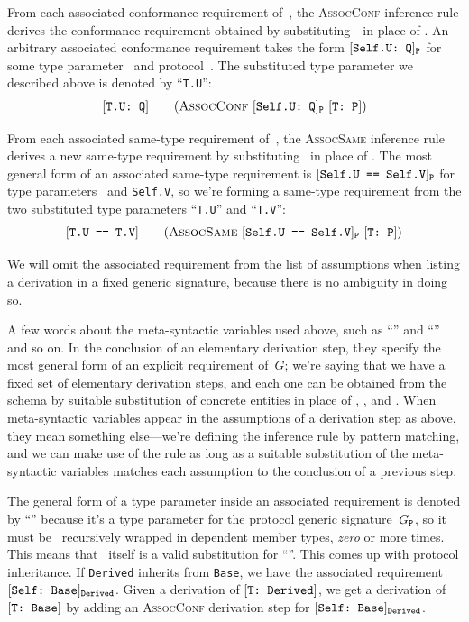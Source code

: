 \documentclass[../generics]{subfiles}
\begin{document}
From each associated conformance requirement of~\tP, the \textsc{AssocConf} inference rule derives the conformance requirement obtained by substituting~\tT\ in place of \IndexSelf \tSelf. An arbitrary associated conformance requirement takes the form $[\texttt{Self.U:~Q}]_{\texttt{P}}$ for some type parameter \SelfU\ and protocol~\tQ. The substituted type parameter we described above is denoted by ``\texttt{T.U}'':
\begin{gather*}
\AssocConfStepDef
\end{gather*}

From each associated same-type requirement of~\tP, the \textsc{AssocSame} inference rule derives a new same-type requirement by substituting \tT\ in place of \tSelf. The most general form of an associated same-type requirement is $[\texttt{Self.U == Self.V}]_{\texttt{P}}$ for type parameters \SelfU\ and \texttt{Self.V}, so we're forming a same-type requirement from the two substituted type parameters ``\texttt{T.U}'' and ``\texttt{T.V}'':
\begin{gather*}
\AssocSameStepDef
\end{gather*}

We will omit the associated requirement from the list of assumptions when listing a derivation in a fixed generic signature, because there is no ambiguity in doing so.

A few words about the meta-syntactic variables used above, such as ``\tT'' and ``\tU'' and so on. In the conclusion of an elementary derivation step, they specify the most general form of an explicit requirement of~$G$; we're saying that we have a fixed set of elementary derivation steps, and each one can be obtained from the schema by suitable substitution of concrete entities in place of \tT, \tU, and \tP. When meta-syntactic variables appear in the assumptions of a derivation step as above, they mean something else---we're defining the inference rule by pattern matching, and we can make use of the rule as long as a suitable substitution of the meta-syntactic variables matches each assumption to the conclusion of a previous step.

The general form of a type parameter inside an associated requirement is denoted by ``\SelfU'' because it's a type parameter for the protocol generic signature~$G_{\texttt{P}}$, so it must be \tSelf\ recursively wrapped in dependent member types, \emph{zero} or more times. This means that \tSelf\ itself is a valid substitution for ``\SelfU''. This comes up with protocol inheritance. If \texttt{Derived} inherits from \texttt{Base}, we have the associated requirement $[\texttt{Self:~Base}]_{\texttt{Derived}}$. Given a derivation of $[\texttt{T:~Derived}]$, we get a derivation of $[\texttt{T:~Base}]$ by adding an \textsc{AssocConf} derivation step for $[\texttt{Self:~Base}]_{\texttt{Derived}}$.
\end{document}
